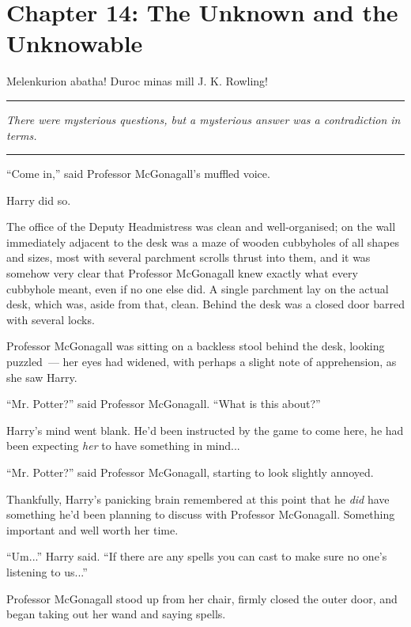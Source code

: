 \chapter{Chapter 14: The Unknown and the Unknowable}
Melenkurion abatha! Duroc minas mill J. K. Rowling!

\begin{center}\rule{3in}{0.4pt}\end{center}

\emph{There were mysterious questions, but a mysterious answer was a contradiction in terms.}

\begin{center}\rule{3in}{0.4pt}\end{center}

``Come in,'' said Professor McGonagall's muffled voice.

Harry did so.

The office of the Deputy Headmistress was clean and well-organised; on the wall immediately adjacent to the desk was a maze of wooden cubbyholes of all shapes and sizes, most with several parchment scrolls thrust into them, and it was somehow very clear that Professor McGonagall knew exactly what every cubbyhole meant, even if no one else did. A single parchment lay on the actual desk, which was, aside from that, clean. Behind the desk was a closed door barred with several locks.

Professor McGonagall was sitting on a backless stool behind the desk, looking puzzled~--- her eyes had widened, with perhaps a slight note of apprehension, as she saw Harry.

``Mr. Potter?'' said Professor McGonagall. ``What is this about?''

Harry's mind went blank. He'd been instructed by the game to come here, he had been expecting \emph{her} to have something in mind...

``Mr. Potter?'' said Professor McGonagall, starting to look slightly annoyed.

Thankfully, Harry's panicking brain remembered at this point that he \emph{did} have something he'd been planning to discuss with Professor McGonagall. Something important and well worth her time.

``Um...'' Harry said. ``If there are any spells you can cast to make sure no one's listening to us...''

Professor McGonagall stood up from her chair, firmly closed the outer door, and began taking out her wand and saying spells.

